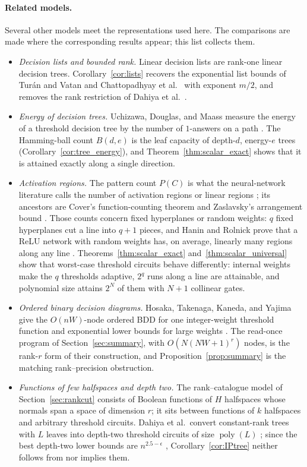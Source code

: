 \documentclass[11pt]{article}
\theoremstyle{definition}
\newcommand{\poly}{\operatorname{poly}}
\begin{document}
\paragraph{Related models.}
Several other models meet the representations used here. The comparisons are made where the corresponding results appear; this list collects them.
\begin{itemize}
 \item \emph{Decision lists and bounded rank.} Linear decision lists are rank-one linear decision trees. Corollary~\ref{cor:lists} recovers the exponential list bounds of Tur\'an and Vatan \cite{TV97} and Chattopadhyay et al.~\cite{CMMS20} with exponent \(m/2\), and removes the rank restriction of Dahiya et al.~\cite{Dahiya23}.
 \item \emph{Energy of decision trees.} Uchizawa, Douglas, and Maass measure the energy of a threshold decision tree by the number of \(1\)-answers on a path \cite{UDM06}. The Hamming-ball count \(B(d,e)\) is the leaf capacity of depth-\(d\), energy-\(e\) trees (Corollary~\ref{cor:tree_energy}), and Theorem~\ref{thm:scalar_exact} shows that it is attained exactly along a single direction.
 \item \emph{Activation regions.} The pattern count \(P(C)\) is what the neural-network literature calls the number of activation regions or linear regions \cite{MPCB14,RPKGS17,STR18}; its ancestors are Cover's function-counting theorem and Zaslavsky's arrangement bound \cite{Cover65,Zaslavsky75}. Those counts concern fixed hyperplanes or random weights: \(q\) fixed hyperplanes cut a line into \(q+1\) pieces, and Hanin and Rolnick prove that a ReLU network with random weights has, on average, linearly many regions along any line \cite{HR19}. Theorems~\ref{thm:scalar_exact} and~\ref{thm:scalar_universal} show that worst-case threshold circuits behave differently: internal weights make the \(q\) thresholds adaptive, \(2^q\) runs along a line are attainable, and polynomial size attains \(2^N\) of them with \(N+1\) collinear gates.
 \item \emph{Ordered binary decision diagrams.} Hosaka, Takenaga, Kaneda, and Yajima give the \(O(nW)\)-node ordered BDD for one integer-weight threshold function and exponential lower bounds for large weights \cite{HTKY97}. The read-once program of Section~\ref{sec:summary}, with \(O(N(NW+1)^r)\) nodes, is the rank-\(r\) form of their construction, and Proposition~\ref{prop:summary} is the matching rank--precision obstruction.
 \item \emph{Functions of few halfspaces and depth two.} The rank--catalogue model of Section~\ref{sec:rankcut} consists of Boolean functions of \(H\) halfspaces whose normals span a space of dimension \(r\); it sits between functions of \(k\) halfspaces \cite{GOWZ10} and arbitrary threshold circuits. Dahiya et al.\ convert constant-rank trees with \(L\) leaves into depth-two threshold circuits of size \(\poly(L)\) \cite{Dahiya23}; since the best depth-two lower bounds are \(n^{2.5-\epsilon}\) \cite{CTW26}, Corollary~\ref{cor:IPtree} neither follows from nor implies them.

\end{itemize}
\end{document}

